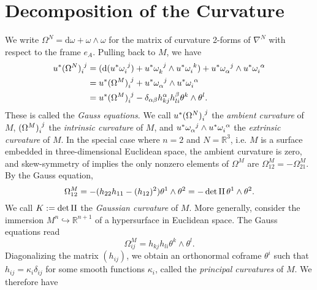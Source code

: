 \documentclass{book}
\newcommand{\bbR}{\mathbb{R}}
\renewcommand{\d}{\mathrm{d}}
\theoremstyle{definition}
\numberwithin{equation}{section}
\begin{document}
\section{Decomposition of the Curvature}

We write $\Omega^N = \d\omega + \omega \wedge \omega$ for the matrix of curvature 2-forms of $\nabla^N$ with respect to the frame $e_A$. Pulling back to $M$, we have 
\begin{equation} \begin{aligned}
    u^*\tensor{(\Omega^N)}{_i^j} &= (\d(u^*\tensor{\omega}{_i^j}) + u^*\tensor{\omega}{_k^j} \wedge u^* \tensor{\omega}{_i^k})
                                    + u^*\tensor{\omega}{_\alpha^j} \wedge u^* \tensor{\omega}{_i^\alpha} \\
                                 &= u^* \tensor{(\Omega^M)}{_i^j} + u^*\tensor{\omega}{_\alpha^j} \wedge u^* \tensor{\omega}{_i^\alpha} \\
                                 &= u^* \tensor{(\Omega^M)}{_i^j} - \delta_{\alpha\beta} h_{kj}^\alpha h_{li}^\beta \theta^k \wedge \theta^l.
\end{aligned} \end{equation}
These is called the \textit{Gauss equations}. We call $u^*\tensor{(\Omega^N)}{_i^j}$ the \textit{ambient curvature} of $M$, $\tensor{(\Omega^M)}{_i^j}$ the \textit{intrinsic curvature} of $M$, and $u^*\tensor{\omega}{_\alpha^j} \wedge u^* \tensor{\omega}{_i^\alpha}$ the \textit{extrinsic curvature} of $M$. In the special case where $n = 2$ and $N = \bbR^3$, i.e. $M$ is a surface embedded in three-dimensional Euclidean space, the ambient curvature is zero, and skew-symmetry of implies the only nonzero elements of $\Omega^M$ are $\Omega^M_{12} = -\Omega^M_{21}$. By the Gauss equation,
\begin{equation}
    \Omega^M_{12} = - ( h_{22} h_{11} - (h_{12})^2 ) \theta^1 \wedge \theta^2 = - \det{\rm II} \, \theta^1 \wedge \theta^2.
\end{equation}
We call $K := \det{\rm II}$ the \textit{Gaussian curvature} of $M$. More generally, consider the immersion $M^n \hookrightarrow \bbR^{n + 1}$ of a hypersurface in Euclidean space. The Gauss equations read 
\begin{equation}
    \Omega^M_{ij} = h_{kj} h_{li} \theta^k \wedge \theta^l.
\end{equation}
Diagonalizing the matrix $(h_{ij})$, we obtain an orthonormal coframe $\theta^i$ such that $h_{ij} = \kappa_i \delta_{ij}$ for some smooth functions $\kappa_i$, called the \textit{principal curvatures} of $M$. We therefore have 
\end{document}
